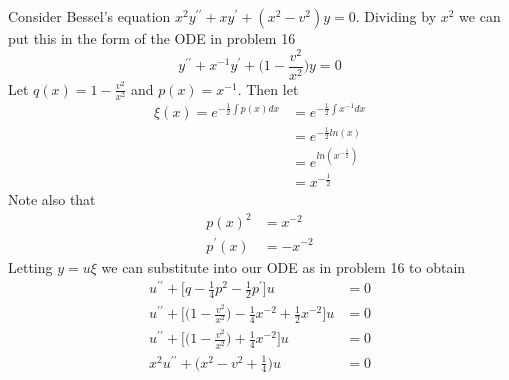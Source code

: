 \documentclass[12pt]{article}
\begin{document}
	Consider Bessel's equation $x^2y^{\prime\prime} + xy^\prime + (x^2-v^2)y = 0$. Dividing by $x^2$ we can put this in the form of the ODE in problem 16
	$$
	y^{\prime\prime} + x^{-1}y^\prime + \Big(1-\frac{v^2}{x^2} \Big)y = 0
	$$
	Let $q(x) = 1-\frac{v^2}{x^2}$ and $p(x) = x^{-1}$. Then let
	\begin{align*}
		\xi(x) = e^{-\frac{1}{2}\int p(x)dx} & = e^{-\frac{1}{2}\int x^{-1}dx} \\
		& = e^{-\frac{1}{2}ln(x)} \\
		& = e^{ln(x^{-\frac{1}{2}})} \\
		& = x^{-\frac{1}{2}}
	\end{align*}
	Note also that
	\begin{align*}
		p(x)^2 & = x^{-2} \\
		p^\prime(x) & = -x^{-2}
	\end{align*}
	Letting $y = u\xi$ we can substitute into our ODE as in problem 16 to obtain
	\begin{align*}
		u^{\prime\prime} + \Big[ q  - \frac{1}{4}p^2 - \frac{1}{2}p^\prime \Big]u  & = 0 \\
		u^{\prime\prime} + \Big[ \Big(1-\frac{v^2}{x^2} \Big)  - \frac{1}{4}x^{-2} + \frac{1}{2}x^{-2} \Big]u  & = 0 \\
		u^{\prime\prime} + \Big[ \Big(1-\frac{v^2}{x^2} \Big)  + \frac{1}{4}x^{-2} \Big]u  & = 0 \\
		x^2u^{\prime\prime} + \Big(x^2-v^2 + \frac{1}{4} \Big)u  & = 0 \\
	\end{align*}
\end{document}
